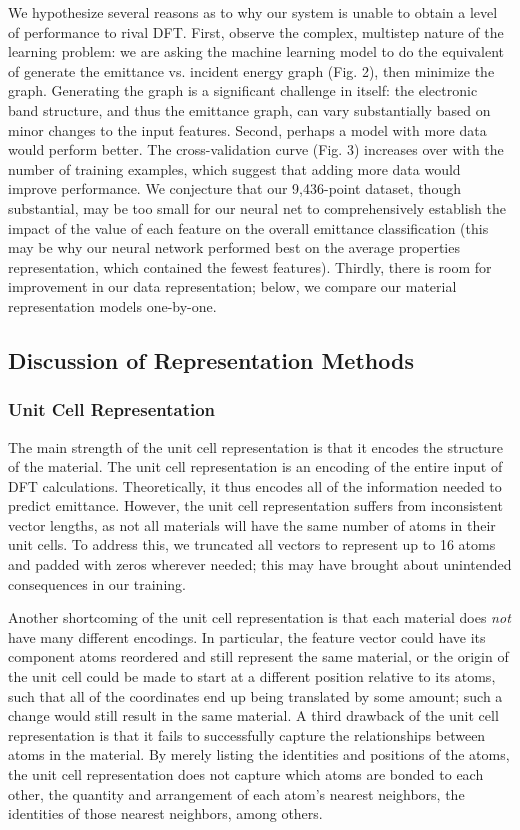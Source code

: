 \documentclass[10pt,twocolumn,letterpaper]{article}
\begin{document}
We hypothesize several reasons as to why our system is unable to obtain a level of performance to rival DFT. First, observe the complex, multistep nature of the learning problem: we are asking the machine learning model to do the equivalent of generate the emittance vs. incident energy graph (Fig. 2), then minimize the graph. Generating the graph is a significant challenge in itself: the electronic band structure, and thus the emittance graph, can vary substantially based on minor changes to the input features. Second, perhaps a model with more data would perform better. The cross-validation curve (Fig. 3) increases over with the number of training examples, which suggest that adding more data would improve performance. We conjecture that our 9,436-point dataset, though substantial, may be too small for our neural net to comprehensively establish the impact of the value of each feature on the overall emittance classification (this may be why our neural network performed best on the average properties representation, which contained the fewest features). Thirdly, there is room for improvement in our data representation; below, we compare our material representation models one-by-one.

\subsection{Discussion of Representation Methods}
\subsubsection{Unit Cell Representation}
The main strength of the unit cell representation is that it encodes the structure of the material. The unit cell representation is an encoding of the entire input of DFT calculations. Theoretically, it thus encodes all of the information needed to predict emittance. However, the unit cell representation suffers from inconsistent vector lengths, as not all materials will have the same number of atoms in their unit cells. To address this, we truncated all vectors to represent up to 16 atoms and padded with zeros wherever needed; this may have brought about unintended consequences in our training. 

Another shortcoming of the unit cell representation is that each material does \textit{not} have many different encodings.   In particular, the feature vector could have its component atoms reordered and still represent the same material, or the origin of the unit cell could be made to start at a different position relative to its atoms, such that all of the coordinates end up being translated by some amount; such a change would still result in the same material. A third drawback of the unit cell representation is that it fails to successfully capture the relationships between atoms in the material. By merely listing the identities and positions of the atoms, the unit cell representation does not capture which atoms are bonded to each other, the quantity and arrangement of each atom's nearest neighbors, the identities of those nearest neighbors, among others.
\end{document}
